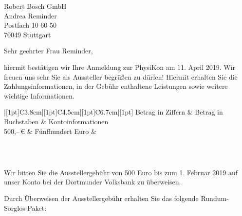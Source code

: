 \documentclass[
  pepbrief,
  fontsize=12pt,
  paper=a4,
  DIV=14,
  parskip=half,
  backaddress=false,
]{scrlttr2}
\author{Lena Linhoff}
\begin{document}
\begin{letter}{%
  Robert Bosch GmbH\\
  Andrea Reminder\\
  Postfach 10 60 50\\
  70049 Stuttgart

}
\opening{Sehr geehrter Frau Reminder,}
hiermit bestätigen wir Ihre Anmeldung zur PhysiKon am 11. April 2019. Wir freuen uns sehr Sie als Aussteller begrüßen zu dürfen!
Hiermit erhalten Sie die Zahlungsinformationen, in der Gebühr enthaltene Leistungen sowie weitere wichtige Informationen.

\renewcommand{\arraystretch}{1.2}
\begin{center}
  \bfseries\scshape
	\begin{tabu}{|[1pt]C{3.8cm}|[1pt]C{4.5cm}|[1pt]C{6.7cm}|[1pt]}
		\tabucline[1pt]{-}
		 Betrag in Ziffern	&	Betrag in Buchstaben & Kontoinformationen\\
		\tabucline[1pt]{-}
    500,–\,€ & \normalfont Fünfhundert Euro & \normalfont \begin{tabular}{@{}c@{}}\end{tabular}\\
		\tabucline[1pt]{-}
	\end{tabu}
\end{center}
Wir bitten Sie die Ausstellergebühr von 500 Euro bis zum 1. Februar 2019 auf unser Konto bei der Dortmunder Volksbank zu überweisen.

Durch Überweisen der Ausstellergebühr erhalten Sie das folgende Rundum-Sorglos-Paket:


\end{letter}
\end{document}
